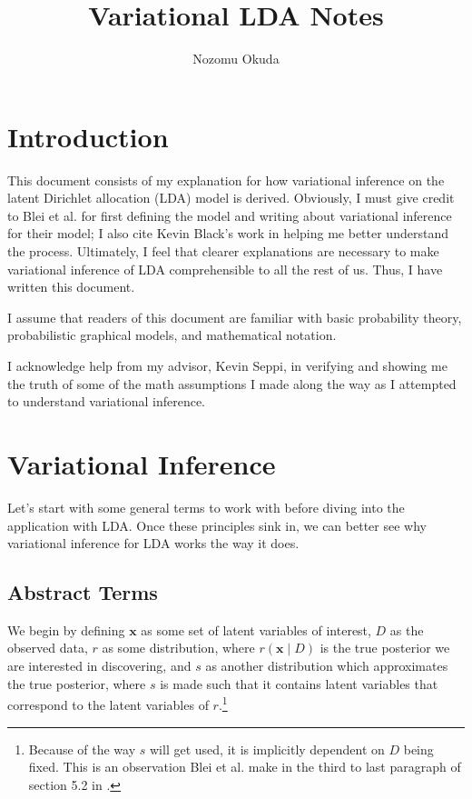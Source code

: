 \documentclass[12pt]{article}
\title{Variational LDA Notes}
\author{Nozomu Okuda}
\begin{document}
\maketitle

\section{Introduction}

This document consists of my explanation for how variational inference on the
latent Dirichlet allocation (LDA) model is derived.  Obviously, I must give
credit to Blei et al.\@ \autocite{Blei:2003:LDA} for first defining the model
and writing about variational inference for their model; I also cite Kevin
Black's work \autocite{kb} in helping me better understand the process.
Ultimately, I feel that clearer explanations are necessary to make variational
inference of LDA comprehensible to all the rest of us.  Thus, I have written
this document.

I assume that readers of this document are familiar with basic probability
theory, probabilistic graphical models, and mathematical notation.

I acknowledge help from my advisor, Kevin Seppi, in verifying and showing me the
truth of some of the math assumptions I made along the way as I attempted to
understand variational inference.

\section{Variational Inference}

Let's start with some general terms to work with before diving into the
application with LDA.  Once these principles sink in, we can better see why
variational inference for LDA works the way it does.

\subsection{Abstract Terms}

We begin by defining $\bm{x}$ as some set of latent variables of interest, $D$
as the observed data, $r$ as some distribution, where $r(\bm{x} \mid D)$ is the
true posterior we are interested in discovering, and $s$ as another distribution
which approximates the true posterior, where $s$ is made such that it contains
latent variables that correspond to the latent variables of $r$.\footnote{
Because of the way $s$ will get used, it is implicitly dependent on $D$ being
fixed.  This is an observation Blei et al. make in the third to last paragraph
of section 5.2 in \autocite{Blei:2003:LDA}.}
\end{document}
